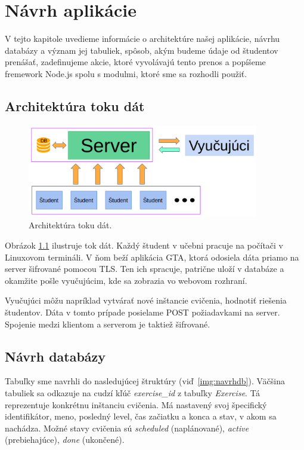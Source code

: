 \chapter{Návrh aplikácie}
\label{kap:navrh}

V tejto kapitole uvedieme informácie o architektúre našej aplikácie, návrhu databázy a
význam jej tabuliek, spôsob, akým budeme údaje od študentov prenášať, zadefinujeme akcie,
ktoré vyvolávajú tento prenos a popíšeme fremework Node.js spolu s modulmi, ktoré sme sa
rozhodli použiť.

\section{Architektúra toku dát}
\label{sec:architekturadata}

\begin{figure}[h]
	\centerline{\includegraphics[width=0.9\textwidth]{images/architekturadat.png}}
	\caption[Architektúra toku dát]{Architektúra toku dát.}
	\label{img:architekturadata}
\end{figure}

Obrázok \ref{img:architekturadata} ilustruje tok dát. Každý študent v učebni pracuje
na počítači v Linuxovom termináli. V ňom beží aplikácia GTA, ktorá odosiela dáta
priamo na server šifrované pomocou TLS. Ten ich spracuje, patrične uloží v databáze
a okamžite pošle vyučujúcim, kde sa zobrazia vo webovom rozhraní.

Vyučujúci môžu napríklad vytvárať nové inštancie cvičenia, hodnotiť riešenia študentov.
Dáta v tomto prípade posielame POST požiadavkami na server. Spojenie medzi klientom
a serverom je taktiež šifrované.

\section{Návrh databázy}
\label{sec:navrhdb}

Tabuľky sme navrhli do nasledujúcej štruktúry (viď~\ref{img:navrhdb}).
Väčšina tabuliek sa odkazuje na cudzí kľúč \textit{exercise\_id} z tabuľky
\textit{Exercise}. Tá reprezentuje konkrétnu inštanciu cvičenia. Má nastavený svoj
špecifický identifikátor, meno, posledný level, čas začiatku a konca a stav, v
akom sa nachádza. Možné stavy cvičenia sú \textit{scheduled} (naplánované),
\textit{active} (prebiehajúce), \textit{done} (ukončené).

